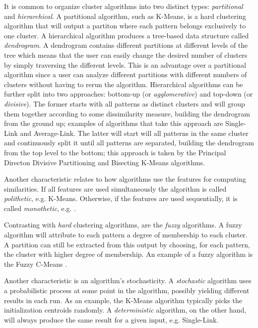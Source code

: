 It is common to organize cluster algorithms into two distinct types: \emph{partitional} and \emph{hierarchical}.
A partitional algorithm, such as K-Means, is a hard clustering algorithm that will output a partiton where each pattern belongs exclusively to one cluster.
A hierarchical algorithm produces a tree-based data structure called \emph{dendrogram}.
A dendrogram contains different partitions at different levels of the tree which means that the user can easily change the desired number of clusters by simply traversing the different levels.
This is an advantage over a partitional algorithm since a user can analyze different partitions with different numbers of clusters without having to rerun the algorithm.
Hierarchical algorithms can be further split into two approaches: bottom-up (or \emph{agglomerative}) and top-down (or \emph{divisive}).
The former starts with all patterns as distinct clusters and will group them together according to some dissimilarity measure, building the dendrogram from the ground up; examples of algorithms that take this approach are Single-Link and Average-Link.
The latter will start will all patterns in the same cluster and continuously split it until all patterns are separated, building the dendrogram from the top level to the bottom; this approach is taken by the Principal Directon Divisive Partitioning \cite{Boley1998} and Bisecting K-Means \cite{Steinbach2000} algorithms.


Another characteristic relates to how algorithms use the features for computing similarities.
If all features are used simultaneously the algorithm is called \emph{polithetic}, e.g. K-Means.
Otherwise, if the features are used sequentially, it is called \emph{monothetic}, e.g. \cite{Chavent1998}.

Contrasting with \emph{hard} clustering algorithms, are the \emph{fuzzy} algorithms.
A fuzzy algorithm will attribute to each pattern a degree of membership to each cluster.
A partition can still be extracted from this output by choosing, for each pattern, the cluster with higher degree of membership.
An example of a fuzzy algorithm is the Fuzzy C-Means \cite{Bezdek1984}.

Another characteristic is an algorithm's stochasticity.
A \emph{stochastic} algorithm uses a probabilistic process at some point in the algorithm, possibly yielding different results in each run.
As an example, the K-Means algorithm typically picks the initialization centroids randomly.
A \emph{deterministic} algorithm, on the other hand, will always produce the same result for a given input, e.g. Single-Link.

